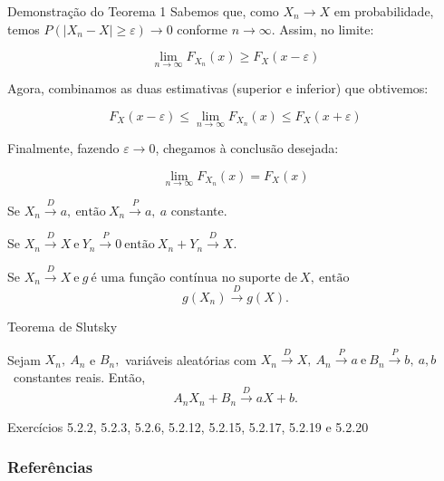 \documentclass[12pt]{beamer}
\begin{document}
\begin{frame}{}
	\begin{block}{Demonstração do Teorema 1}
	Sabemos que, como \( X_n \to X \) em probabilidade, temos \( P(|X_n - X| \geq \varepsilon) \to 0 \) conforme \( n \to \infty \). Assim, no limite:
	
	\[
	\lim_{n \to \infty} F_{X_n}(x) \geq F_X(x - \varepsilon)
	\]
	
	
	Agora, combinamos as duas estimativas (superior e inferior) que obtivemos:
	
	\[
	F_X(x - \varepsilon) \leq \lim_{n \to \infty} F_{X_n}(x) \leq F_X(x + \varepsilon)
	\]
	
	Finalmente, fazendo \( \varepsilon \to 0 \), chegamos à conclusão desejada:
	
	\[
	\lim_{n \to \infty} F_{X_n}(x) = F_X(x)
	\]	
	\end{block}
\end{frame}


\begin{frame}{}
\begin{Teorema}
\justifying
Se $X_{n} \overset{D}{\rightarrow} a,~\text{então}~X_{n} \overset{P}{\rightarrow} a,~a$ constante.
\end{Teorema}
\end{frame}

\begin{frame}{}
\begin{Teorema}
\justifying
Se $X_{n} \overset{D}{\rightarrow} X~\text{e}~Y_{n} \overset{P}{\rightarrow} 0~\text{então}~X_{n}+Y_{n} \overset{D}{\rightarrow} X.$
\end{Teorema}
\end{frame}

\begin{frame}{}
\begin{Teorema}
\justifying
Se $X_{n} \overset{D}{\rightarrow} X~\text{e}~g~\text{é uma função contínua no suporte de}~X,~\text{então}~$ $$g(X_{n}) \overset{D}{\rightarrow} g(X).$$
\end{Teorema}
\end{frame}

\begin{frame}{Teorema de Slutsky}
\begin{Teorema}
\justifying
Sejam $X_{n},~A_{n}$ e $B_{n},$ variáveis aleatórias com $X_{n} \overset{D}{\rightarrow} X,~A_{n} \overset{P}{\rightarrow} a~\text{e}~B_{n} \overset{P}{\rightarrow} b,~a,b$~constantes reais. Então, $$A_{n}X_{n}+B_{n} \overset{D}{\rightarrow} aX+b.$$
\end{Teorema}
\end{frame}

\begin{frame}{}
\begin{block}{\Home}
	\nocite{hogg}
\justifying
Exercícios 5.2.2, 5.2.3, 5.2.6, 5.2.12, 5.2.15, 5.2.17, 5.2.19 e 5.2.20
\end{block}
\end{frame}

\begin{frame}[allowframebreaks]
\frametitle{\bf Referências}
\printbibliography
\end{frame}
\end{document}
